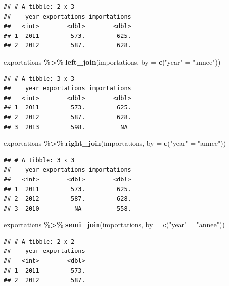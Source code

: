 \documentclass[
  11pt,
]{book}
\newenvironment{Shaded}{\begin{snugshade}}{\end{snugshade}}
\newcommand{\DataTypeTok}[1]{\textcolor[rgb]{0.13,0.29,0.53}{#1}}
\newcommand{\KeywordTok}[1]{\textcolor[rgb]{0.13,0.29,0.53}{\textbf{#1}}}
\newcommand{\NormalTok}[1]{#1}
\newcommand{\OperatorTok}[1]{\textcolor[rgb]{0.81,0.36,0.00}{\textbf{#1}}}
\newcommand{\StringTok}[1]{\textcolor[rgb]{0.31,0.60,0.02}{#1}}
\numberwithin{equation}{section}
\numberwithin{countremarque}{section}
\begin{document}
\begin{lstlisting}
## # A tibble: 2 x 3
##    year exportations importations
##   <int>        <dbl>        <dbl>
## 1  2011         573.         625.
## 2  2012         587.         628.
\end{lstlisting}

\begin{Shaded}
\begin{Highlighting}[]
\NormalTok{exportations }\OperatorTok{\%\textgreater{}\%}\StringTok{ }\KeywordTok{left\_join}\NormalTok{(importations, }\DataTypeTok{by =} \KeywordTok{c}\NormalTok{(}\StringTok{"year"}\NormalTok{ =}\StringTok{ "annee"}\NormalTok{))}
\end{Highlighting}
\end{Shaded}

\begin{lstlisting}
## # A tibble: 3 x 3
##    year exportations importations
##   <int>        <dbl>        <dbl>
## 1  2011         573.         625.
## 2  2012         587.         628.
## 3  2013         598.          NA
\end{lstlisting}

\begin{Shaded}
\begin{Highlighting}[]
\NormalTok{exportations }\OperatorTok{\%\textgreater{}\%}\StringTok{ }\KeywordTok{right\_join}\NormalTok{(importations, }\DataTypeTok{by =} \KeywordTok{c}\NormalTok{(}\StringTok{"year"}\NormalTok{ =}\StringTok{ "annee"}\NormalTok{))}
\end{Highlighting}
\end{Shaded}

\begin{lstlisting}
## # A tibble: 3 x 3
##    year exportations importations
##   <int>        <dbl>        <dbl>
## 1  2011         573.         625.
## 2  2012         587.         628.
## 3  2010          NA          558.
\end{lstlisting}

\begin{Shaded}
\begin{Highlighting}[]
\NormalTok{exportations }\OperatorTok{\%\textgreater{}\%}\StringTok{ }\KeywordTok{semi\_join}\NormalTok{(importations, }\DataTypeTok{by =} \KeywordTok{c}\NormalTok{(}\StringTok{"year"}\NormalTok{ =}\StringTok{ "annee"}\NormalTok{))}
\end{Highlighting}
\end{Shaded}

\begin{lstlisting}
## # A tibble: 2 x 2
##    year exportations
##   <int>        <dbl>
## 1  2011         573.
## 2  2012         587.
\end{lstlisting}
\end{document}
